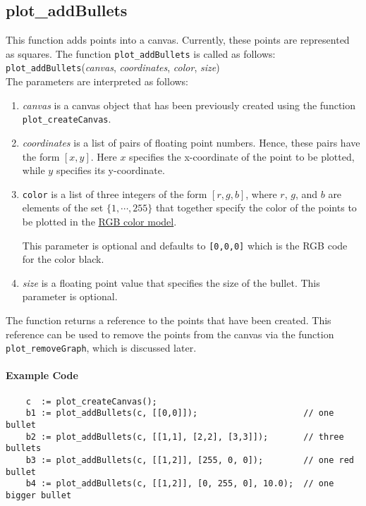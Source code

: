 \subsection{plot\_addBullets} 
This function adds points into a canvas.  Currently, these points are represented as squares.
The function \texttt{plot\_addBullets} is called as follows:
\\[0.2cm]
\hspace*{1.3cm}
\texttt{plot\_addBullets}(\textsl{canvas}, \textsl{coordinates}, \textsl{color}, \textsl{size})
\\[0.2cm]
The parameters are interpreted as follows:
\begin{enumerate}
 \item \textsl{canvas} is a canvas object that has been previously created using the function
       \texttt{plot\_createCanvas}.  
\item \textsl{coordinates} is a list of pairs of floating point numbers.  Hence, these pairs have
       the form $[x, y]$.  Here $x$ specifies the x-coordinate of the point to be plotted, while 
       $y$ specifies its y-coordinate.
\item \texttt{color} is a list of three integers of the form $[r,g,b]$, where $r$, $g$, and $b$ are
      elements of the set $\{1, \cdots, 255\}$ that together specify the color of the points
      to be plotted in the \href{https://en.wikipedia.org/wiki/RGB_color_model}{RGB color model}.

      This parameter is optional and defaults to \texttt{[0,0,0]} which is the RGB code for the
      color black.
\item \textsl{size} is a floating point value that specifies the size of the bullet.  
      This parameter is optional.
\end{enumerate}
The function returns a reference to the points that have been created.  This reference can be used
to remove the points from the canvas via the function \texttt{plot\_removeGraph}, which is discussed
later. 

\paragraph{Example Code}
\begin{verbatim}
    c  := plot_createCanvas();
    b1 := plot_addBullets(c, [[0,0]]);                     // one bullet
    b2 := plot_addBullets(c, [[1,1], [2,2], [3,3]]);       // three bullets
    b3 := plot_addBullets(c, [[1,2]], [255, 0, 0]);        // one red bullet
    b4 := plot_addBullets(c, [[1,2]], [0, 255, 0], 10.0);  // one bigger bullet
\end{verbatim}


